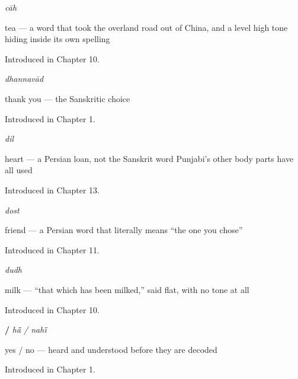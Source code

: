 \noindent\begin{minipage}[t]{\linewidth}
\raggedright
\textbf{}\enspace\emph{cāh}\par
\small tea — a word that took the overland road out of China, and a level high tone hiding inside its own spelling\par
\footnotesize Introduced in Chapter 10.
\end{minipage}\par\medskip

\noindent\begin{minipage}[t]{\linewidth}
\raggedright
\textbf{}\enspace\emph{dhannavād}\par
\small thank you — the Sanskritic choice\par
\footnotesize Introduced in Chapter 1.
\end{minipage}\par\medskip

\noindent\begin{minipage}[t]{\linewidth}
\raggedright
\textbf{}\enspace\emph{dil}\par
\small heart — a Persian loan, not the Sanskrit word Punjabi's other body parts have all used\par
\footnotesize Introduced in Chapter 13.
\end{minipage}\par\medskip

\noindent\begin{minipage}[t]{\linewidth}
\raggedright
\textbf{}\enspace\emph{dost}\par
\small friend — a Persian word that literally means \textquotedblleft{}the one you chose\textquotedblright{}\par
\footnotesize Introduced in Chapter 11.
\end{minipage}\par\medskip

\noindent\begin{minipage}[t]{\linewidth}
\raggedright
\textbf{}\enspace\emph{dudh}\par
\small milk — \textquotedblleft{}that which has been milked,\textquotedblright{} said flat, with no tone at all\par
\footnotesize Introduced in Chapter 10.
\end{minipage}\par\medskip

\noindent\begin{minipage}[t]{\linewidth}
\raggedright
\textbf{ / }\enspace\emph{hā̃ / nahī̃}\par
\small yes / no — heard and understood before they are decoded\par
\footnotesize Introduced in Chapter 1.
\end{minipage}\par\medskip

